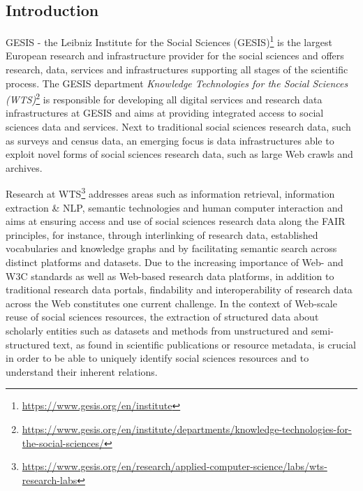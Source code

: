 \subsection {Introduction}


GESIS - the Leibniz Institute for the Social Sciences (GESIS)\footnote{\url{https://www.gesis.org/en/institute}} is the largest European research and infrastructure provider for the social sciences and offers research, data, services and infrastructures supporting all stages of the scientific process. The GESIS department \textit{Knowledge Technologies for the Social Sciences (WTS)}\footnote{\url{ https://www.gesis.org/en/institute/departments/knowledge-technologies-for-the-social-sciences/}} is responsible for developing all digital services and research data infrastructures at GESIS and aims at providing integrated access to social sciences data and services. Next to traditional social sciences research data, such as surveys and census data, an emerging focus is data infrastructures able to exploit novel forms of social sciences research data, such as large Web crawls and archives. 

Research at WTS\footnote{\url{https://www.gesis.org/en/research/applied-computer-science/labs/wts-research-labs}} addresses areas such as information retrieval, information extraction & NLP, semantic technologies and human computer interaction and aims at ensuring access and use of social sciences research data along the FAIR principles, for instance, through interlinking of research data, established vocabularies and knowledge graphs and by facilitating semantic search across distinct platforms and datasets. Due to the increasing importance of Web- and W3C standards as well as Web-based research data platforms, in addition to traditional research data portals, findability and interoperability of research data across the Web constitutes one current challenge. In the context of Web-scale reuse of social sciences resources, the extraction of structured data about scholarly entities such as datasets and methods from unstructured and semi-structured text, as found in scientific publications or resource metadata, is crucial in order to be able to uniquely identify social sciences resources and to understand their inherent relations. 

